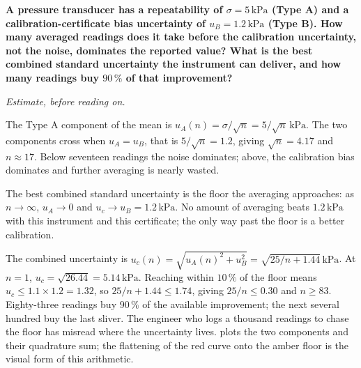 \begin{estimation}
\textbf{A pressure transducer has a repeatability of
$\sigma = 5 \,\si{\kilo\pascal}$ (Type A) and a
calibration-certificate bias uncertainty of
$u_B = 1.2 \,\si{\kilo\pascal}$ (Type B). How many averaged readings
does it take before the calibration uncertainty, not the noise,
dominates the reported value? What is the best combined standard
uncertainty the instrument can deliver, and how many readings buy
$90\,\%$ of that improvement?}

\smallskip
\textit{Estimate, before reading on.}

\smallskip
The Type A component of the mean is $u_A(n) = \sigma/\sqrt{n} =
5/\sqrt{n} \,\si{\kilo\pascal}$. The two components cross when
$u_A = u_B$, that is $5/\sqrt{n} = 1.2$, giving $\sqrt{n} = 4.17$ and
$n \approx 17$. Below seventeen readings the noise dominates; above,
the calibration bias dominates and further averaging is nearly wasted.

The best combined standard uncertainty is the floor the averaging
approaches: as $n \to \infty$, $u_A \to 0$ and
$u_c \to u_B = 1.2 \,\si{\kilo\pascal}$. No amount of averaging beats
$1.2 \,\si{\kilo\pascal}$ with this instrument and this certificate;
the only way past the floor is a better calibration.

The combined uncertainty is $u_c(n) = \sqrt{u_A(n)^2 + u_B^2} =
\sqrt{25/n + 1.44} \,\si{\kilo\pascal}$. At $n = 1$,
$u_c = \sqrt{26.44} = 5.14 \,\si{\kilo\pascal}$. Reaching within
$10\,\%$ of the floor means $u_c \le 1.1 \times 1.2 = 1.32$, so
$25/n + 1.44 \le 1.74$, giving $25/n \le 0.30$ and $n \ge 83$.
Eighty-three readings buy $90\,\%$ of the available improvement; the
next several hundred buy the last sliver. The engineer who logs a
thousand readings to chase the floor has misread where the
uncertainty lives.  plots the
two components and their quadrature sum; the flattening of the red
curve onto the amber floor is the visual form of this arithmetic.
\end{estimation}



